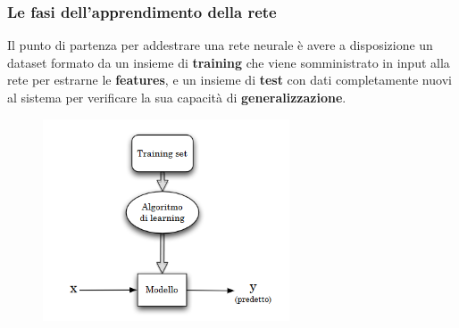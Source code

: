 \documentclass{beamer}
\begin{document}
\begin{frame}
	\frametitle{Le fasi dell'apprendimento della rete}
	Il punto di partenza per  addestrare  una  rete  neurale è avere a disposizione un dataset 
	formato da un insieme di \textbf{training} che viene somministrato in input alla rete per estrarne le \textbf{features},
	 e un insieme di \textbf{test} con dati completamente nuovi al sistema per verificare 
	 la sua capacità di \textbf{generalizzazione}.
	
	 \begin{figure}
		 \includegraphics[width=0.65\textwidth]{schema apprendimento supervisionato.PNG}
		 
	 \end{figure}	
	
\end{frame}


		
	
	
\end{document}
